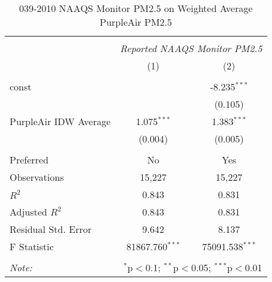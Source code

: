 \begin{table}[!htbp] \centering
  \caption{039-2010 NAAQS Monitor PM2.5 on Weighted Average PurpleAir PM2.5}
  \label{tab:reg_039-2010}
\begin{tabular}{@{\extracolsep{5pt}}lcc}
\\[-1.8ex]\hline
\hline \\[-1.8ex]
& \multicolumn{2}{c}{\textit{Reported NAAQS Monitor PM2.5}} \
\cr \cline{2-3}
\\[-1.8ex] & (1) & (2) \\
\hline \\[-1.8ex]
 const & & -8.235$^{***}$ \\
  & & (0.105) \\
 PurpleAir IDW Average & 1.075$^{***}$ & 1.383$^{***}$ \\
  & (0.004) & (0.005) \\
\hline \\[-1.8ex]
 Preferred & No & Yes \\
 Observations & 15,227 & 15,227 \\
 $R^2$ & 0.843 & 0.831 \\
 Adjusted $R^2$ & 0.843 & 0.831 \\
 Residual Std. Error & 9.642 & 8.137  \\
 F Statistic & 81867.760$^{***}$  & 75091.538$^{***}$  \\
\hline
\hline \\[-1.8ex]
\textit{Note:} & \multicolumn{2}{r}{$^{*}$p$<$0.1; $^{**}$p$<$0.05; $^{***}$p$<$0.01} \\
\end{tabular}
\end{table}